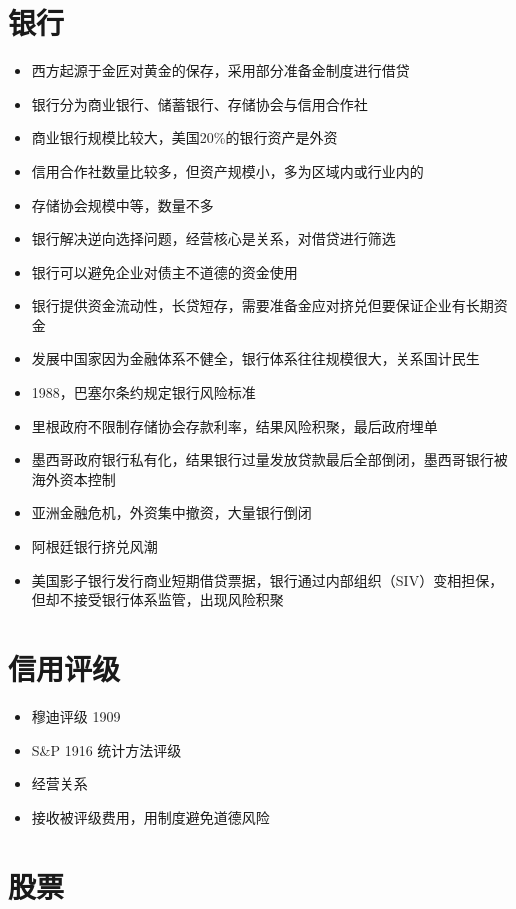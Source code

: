 \documentclass[]{book}
\providecommand{\tightlist}{%
  \setlength{\itemsep}{0pt}\setlength{\parskip}{0pt}}
\begin{document}
\section{银行}

\begin{itemize}
\tightlist
\item
  西方起源于金匠对黄金的保存，采用部分准备金制度进行借贷
\item
  银行分为商业银行、储蓄银行、存储协会与信用合作社
\item
  商业银行规模比较大，美国20\%的银行资产是外资
\item
  信用合作社数量比较多，但资产规模小，多为区域内或行业内的
\item
  存储协会规模中等，数量不多
\item
  银行解决逆向选择问题，经营核心是关系，对借贷进行筛选
\item
  银行可以避免企业对债主不道德的资金使用
\item
  银行提供资金流动性，长贷短存，需要准备金应对挤兑但要保证企业有长期资金
\item
  发展中国家因为金融体系不健全，银行体系往往规模很大，关系国计民生
\item
  1988，巴塞尔条约规定银行风险标准
\item
  里根政府不限制存储协会存款利率，结果风险积聚，最后政府埋单
\item
  墨西哥政府银行私有化，结果银行过量发放贷款最后全部倒闭，墨西哥银行被海外资本控制
\item
  亚洲金融危机，外资集中撤资，大量银行倒闭
\item
  阿根廷银行挤兑风潮
\item
  美国影子银行发行商业短期借贷票据，银行通过内部组织（SIV）变相担保，但却不接受银行体系监管，出现风险积聚
\end{itemize}

\section{信用评级}

\begin{itemize}
\tightlist
\item
  穆迪评级 1909
\item
  S\&P 1916 统计方法评级
\item
  经营关系
\item
  接收被评级费用，用制度避免道德风险
\end{itemize}

\section{股票}
\end{document}
